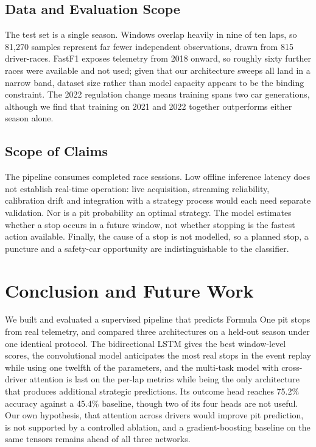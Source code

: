 \documentclass[conference]{IEEEtran}
\begin{document}
\subsection{Data and Evaluation Scope}

The test set is a single season. Windows overlap heavily in nine of ten laps, so 81{,}270 samples represent far fewer independent observations, drawn from 815 driver-races. FastF1 exposes telemetry from 2018 onward, so roughly sixty further races were available and not used; given that our architecture sweeps all land in a narrow band, dataset size rather than model capacity appears to be the binding constraint. The 2022 regulation change means training spans two car generations, although we find that training on 2021 and 2022 together outperforms either season alone.

\subsection{Scope of Claims}

The pipeline consumes completed race sessions. Low offline inference latency does not establish real-time operation: live acquisition, streaming reliability, calibration drift and integration with a strategy process would each need separate validation. Nor is a pit probability an optimal strategy. The model estimates whether a stop occurs in a future window, not whether stopping is the fastest action available. Finally, the cause of a stop is not modelled, so a planned stop, a puncture and a safety-car opportunity are indistinguishable to the classifier.

\section{Conclusion and Future Work}

We built and evaluated a supervised pipeline that predicts Formula One pit stops from real telemetry, and compared three architectures on a held-out season under one identical protocol. The bidirectional LSTM gives the best window-level scores, the convolutional model anticipates the most real stops in the event replay while using one twelfth of the parameters, and the multi-task model with cross-driver attention is last on the per-lap metrics while being the only architecture that produces additional strategic predictions. Its outcome head reaches 75.2\% accuracy against a 45.4\% baseline, though two of its four heads are not useful. Our own hypothesis, that attention across drivers would improve pit prediction, is not supported by a controlled ablation, and a gradient-boosting baseline on the same tensors remains ahead of all three networks.
\end{document}
